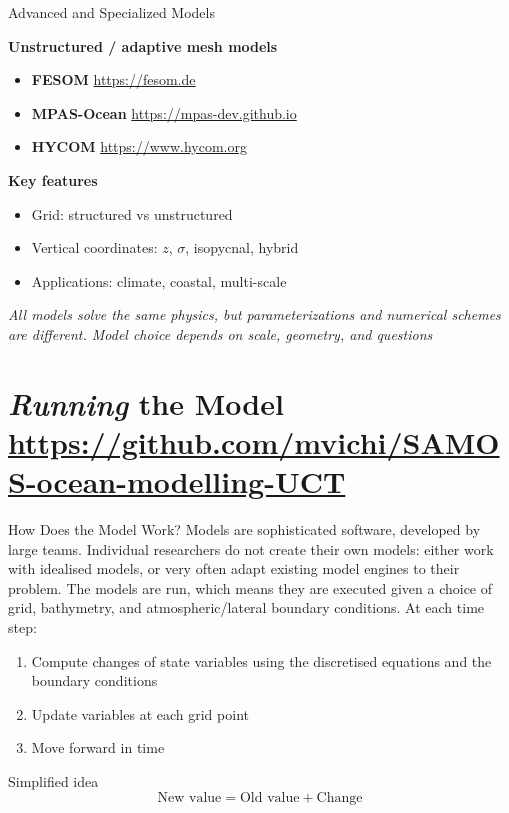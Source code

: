 \documentclass[english,aspectratio=169]{beamer}
\begin{document}
\begin{frame}{Advanced and Specialized Models}

\textbf{Unstructured / adaptive mesh models}
\begin{itemize}
    \item \textbf{FESOM} 
    {\footnotesize \url{https://fesom.de}}
    
    \item \textbf{MPAS-Ocean} 
    {\footnotesize \url{https://mpas-dev.github.io}}

    \item \textbf{HYCOM} 
    {\footnotesize \url{https://www.hycom.org}}
\end{itemize}

\textbf{Key features}
\begin{itemize}
    \item Grid: structured vs unstructured
    \item Vertical coordinates: $z$, $\sigma$, isopycnal, hybrid
    \item Applications: climate, coastal, multi-scale
\end{itemize}

\centering
\small \textit{All models solve the same physics, but parameterizations and numerical schemes are different. Model choice depends on scale, geometry, and questions}

\end{frame}

\section{\textit{Running} the Model \\ \url{https://github.com/mvichi/SAMOS-ocean-modelling-UCT}}
\begin{frame}{How Does the Model Work?}
Models are sophisticated software, developed by large teams. Individual researchers do not create their own models: either work with idealised models, or very often adapt existing model engines to their problem.
The models are run, which means they are executed given a choice of grid, bathymetry, and atmospheric/lateral boundary conditions. At each time step:
\small{
\begin{enumerate}
\item Compute changes of state variables using the discretised equations and the boundary conditions
\item Update variables at each grid point
\item Move forward in time
\end{enumerate}
}
\begin{block}{Simplified idea}
\[
\text{New value} = \text{Old value} + \text{Change}
\]
\end{block}
\end{frame}
\end{document}
